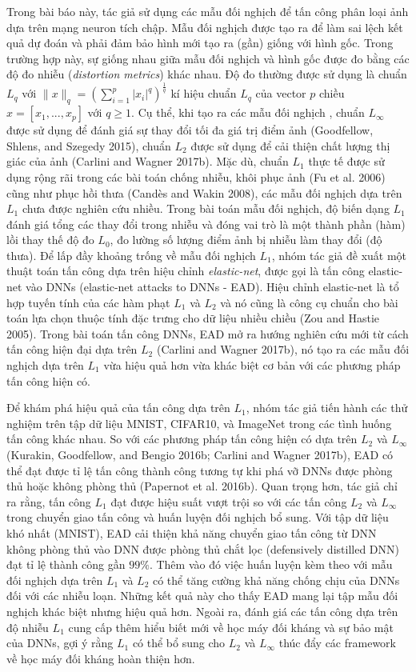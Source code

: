 Trong bài báo này, tác giả sử dụng các mẫu đối nghịch để tấn công phân loại ảnh dựa trên 
mạng neuron tích chập. Mẫu đối nghịch được tạo ra để làm sai lệch kết quả dự đoán và phải đảm bảo
hình mới tạo ra (gần) giống với hình gốc. Trong trường hợp này, sự giống nhau giữa mẫu đối nghịch và hình gốc được đo bằng các độ đo nhiễu (\textit{distortion metrics}) khác nhau.
Độ đo thường được sử dụng là chuẩn $L_q$ 
với $\lVert x \rVert_q = \left( \sum_{i=1}^p |x_i|^q \right)^{\frac{1}{q}}$ kí hiệu chuẩn $L_q$
của vector $p$ chiều $x = [x_1, ..., x_p]$ với $q \geq 1$. Cụ thể, khi tạo ra các mẫu đối nghịch
, chuẩn $L_{\infty}$ được sử dụng để đánh giá sự thay đổi tối đa giá trị điểm ảnh (Goodfellow, 
Shlens, and Szegedy 2015), chuẩn $L_2$ được sử dụng để cải thiện chất lượng thị giác của 
ảnh (Carlini and Wagner 2017b). Mặc dù, chuẩn $L_1$ thực tế được sử dụng rộng rãi 
trong các bài toán chống nhiễu, khôi phục ảnh (Fu et al. 2006) cũng như phục hồi thưa (Candès and Wakin 2008), các mẫu đối nghịch dựa trên $L_1$ chưa được nghiên cứu nhiều. Trong bài toán mẫu đối nghịch,
độ biến dạng $L_1$ đánh giá tổng các thay đổi trong nhiễu và đóng vai trò là một thành phần
(hàm) lồi thay thế độ đo $L_0$, đo lường số lượng điểm ảnh bị nhiễu làm thay đổi (độ thưa). Để lấp đầy khoảng trống về mẫu đối nghịch $L_1$, nhóm tác giả đề xuất một thuật toán tấn công dựa trên hiệu chỉnh \textit{elastic-net}, được 
gọi là tấn công elastic-net vào DNNs (elastic-net attacks to DNNs - EAD). Hiệu chỉnh 
elastic-net là tổ hợp tuyến tính của các hàm phạt $L_1$ và $L_2$ và nó cũng là công cụ 
chuẩn cho bài toán lựa chọn thuộc tính đặc trưng cho dữ liệu nhiều chiều (Zou and Hastie 2005). 
Trong bài toán tấn công DNNs, EAD mở ra hướng nghiên cứu mới từ cách tấn công hiện đại dựa trên 
$L_2$ (Carlini and Wagner 2017b), nó tạo ra các mẫu đối nghịch dựa trên $L_1$ vừa hiệu quả hơn vừa khác biệt cơ bản với các phương pháp tấn công hiện có. 

Để khám phá hiệu quả của tấn công dựa trên $L_1$, nhóm tác giả tiến hành các thử nghiệm trên tập 
dữ liệu MNIST, CIFAR10, và ImageNet trong các tình huống tấn công khác nhau. So với các 
phương pháp tấn công hiện có dựa trên $L_2$ và $L_{\infty}$ (Kurakin, Goodfellow, and 
Bengio 2016b; Carlini and Wagner 2017b), EAD có thể đạt được tỉ lệ tấn công thành công tương 
tự khi phá vỡ DNNs được phòng thủ hoặc không phòng thủ (Papernot et al. 2016b). Quan trọng 
hơn, tác giả chỉ ra rằng, tấn công $L_1$ đạt được hiệu suất vượt trội so với các tấn
công $L_2$ và $L_{\infty}$ trong chuyển giao tấn công và huấn luyện đối nghịch bổ sung. Với tập dữ liệu khó nhất (MNIST), EAD cải thiện khả năng chuyển 
giao tấn công từ DNN không phòng thủ vào DNN được phòng thủ chắt lọc (defensively distilled DNN) đạt tỉ lệ thành công gần $99\%$. Thêm vào 
đó việc huấn luyện kèm theo với mẫu đối nghịch dựa trên $L_1$ và $L_2$ có thể tăng cường khả 
năng chống chịu của DNNs đối với các nhiễu loạn. Những kết quả này cho thấy EAD mang lại tập 
mẫu đối nghịch khác biệt nhưng hiệu quả hơn. Ngoài ra, đánh giá các tấn công dựa trên 
độ nhiễu $L_1$ cung cấp thêm hiểu biết mới về học máy đối kháng và sự bảo mật của DNNs, gợi 
ý rằng $L_1$ có thể bổ sung cho $L_2$ và $L_{\infty}$ thúc đẩy các framework về học máy đối 
kháng hoàn thiện hơn.
